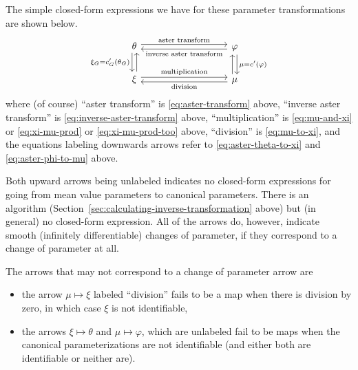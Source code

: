 The simple closed-form expressions we have
for these parameter transformations are shown below.
\begin{equation} \label{eq:plethora-four}
\begin{tikzcd}[column sep=9em]
   \theta
   \arrow[r, "\text{aster transform}", shift left]
   \arrow[d, "\xi_G = c_G'(\theta_G)"', shift right]
   &
   \varphi
   \arrow[l, "\text{inverse aster transform}", shift left]
   \arrow[d, "\mu = c'(\varphi)", shift left]
   \\
   \xi
   \arrow[u, shift right]
   \arrow[r, "\text{multiplication}", shift left]
   &
   \mu
   \arrow[l, "\text{division}", shift left]
   \arrow[u, shift left]
\end{tikzcd}
\end{equation}
where (of course) ``aster transform'' is \eqref{eq:aster-transform} above,
``inverse aster transform'' is \eqref{eq:inverse-aster-transform} above,
``multiplication'' is \eqref{eq:mu-and-xi} or \eqref{eq:xi-mu-prod} or
\eqref{eq:xi-mu-prod-too} above,
``division'' is \eqref{eq:mu-to-xi}, and the equations labeling downwards
arrows refer to \eqref{eq:aster-theta-to-xi} and \eqref{eq:aster-phi-to-mu}
above.

Both upward arrows being unlabeled indicates no closed-form expressions
for going from mean value parameters to canonical parameters.
There is an algorithm (Section~\ref{sec:calculating-inverse-transformation}
above) but (in general) no closed-form expression.
All of the arrows do, however, indicate smooth (infinitely differentiable)
changes of parameter, if they correspond to a change of parameter at all.

The arrows that may not correspond to a change of parameter arrow are
\begin{itemize}
\item the arrow $\mu \mapsto \xi$ labeled ``division'' fails to be a map
    when there is division by zero, in which case $\xi$ is not identifiable,
\item the arrows $\xi \mapsto \theta$ and $\mu \mapsto \varphi$, which
    are unlabeled fail to be maps when the canonical parameterizations
    are not identifiable (and either both are identifiable or neither are).
\end{itemize}

